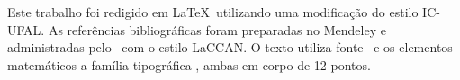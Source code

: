 \documentclass[tcc]{ic}
\begin{document}


\mylistofcontents


\inicio
\setcounter{page}{9} %








\appendix





\begin{raggedright}
%

\renewcommand{\bibsection}{
\chapter*{\vspace{-3cm}\centering \Large \textsc{Referências Bibliográficas}}
\addcontentsline{toc}{chapter}{Referências Bibliográficas}
}

\newpage\lhead{\rightmark}
\end{raggedright}



\chapter*{}
\vfill
\singlespacing
\thispagestyle{empty}
\begin{center}
Este trabalho foi redigido em {\large \LaTeX}\ utilizando uma modificação do estilo \textsf{IC-UFAL}.
As referências bibliográficas foram preparadas no \textsf{Mendeley} e administradas pelo {\large\BibTeX}\ com o estilo \textsf{LaCCAN}.
O texto utiliza fonte \NomeFonte\ e os elementos matemáticos a família tipográfica \NomeFonteMat, ambas em corpo de 12 pontos.
\end{center}
\end{document}
